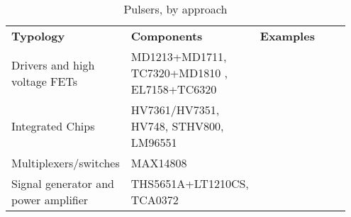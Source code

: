 

\begin{table}[h!]
\begin{tabular}{p{0.2\linewidth} | p{0.3\linewidth} | p{0.45\linewidth} }%
\textbf{Typology}                    & \textbf{Components}          & \textbf{Examples} \\

Drivers and high voltage FETs  
& MD1213+MD1711, TC7320+MD1810 , EL7158+TC6320
& \cite{sharma_development_2015,wu_novel_2013,ching_chu_designing_nodate}                 \\

Integrated Chips 
& HV7361/HV7351, HV748, STHV800, LM96551
& \cite{martins_-scan_2017,zhang_multi-channel_2017,hewener_highly_2012,worthing_using_2016}                 \\

Multiplexers/switches 
& MAX14808
& \cite{rodriguez-olivares_improvement_2018,lee_new_2014,garcia_piezoelectric_2014,boni_ula-op_2016} \\

Signal generator and power amplifier 
& THS5651A+LT1210CS, TCA0372
& \cite{matera_smart_2018,choi_versatile_2020}
\end{tabular}
\caption{Pulsers, by approach}
\label{tab:pulser}
\end{table}